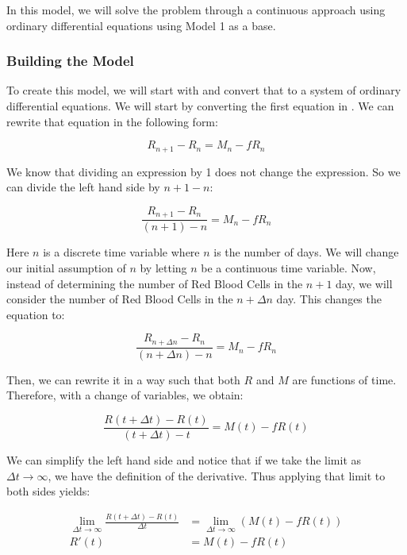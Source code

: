 In this model, we will solve the problem through a continuous approach using ordinary differential equations using Model 1 as a base.

\subsubsection{Building the Model}

To create this model, we will start with  and convert that to a system of ordinary differential equations. We will start by converting the first equation in . We can rewrite that equation in the following form:

\begin{equation*}
    R_{n+1} - R_n = M_n - fR_n
\end{equation*}

We know that dividing an expression by 1 does not change the expression. So we can divide the left hand side by $n+1-n$:

\begin{equation*}
    \frac{R_{n+1} - R_n}{(n+1)-n} = M_n - fR_n
\end{equation*}

Here $n$ is a discrete time variable where $n$ is the number of days. We will change our initial assumption of $n$ by letting $n$ be a continuous time variable. Now, instead of determining the number of Red Blood Cells in the $n+1$ day, we will consider the number of Red Blood Cells in the $n+\Delta n$ day. This changes the equation to:

\begin{equation*}
    \frac{R_{n+\Delta n} - R_n}{(n+\Delta n)-n} = M_n - fR_n
\end{equation*}

Then, we can rewrite it in a way such that both $R$ and $M$ are functions of time. Therefore, with a change of variables, we obtain:

\begin{equation*}
    \frac{R(t+\Delta t) - R(t)}{(t+\Delta t)-t} = M(t) - fR(t)
\end{equation*}

We can simplify the left hand side and notice that if we take the limit as $\Delta t\to\infty$, we have the definition of the derivative. Thus applying that limit to both sides yields:

\begin{align}
    \lim_{\Delta t\to\infty} \frac{R(t+\Delta t) - R(t)}{\Delta t} &= \lim_{\Delta t\to\infty} (M(t) - fR(t)) \nonumber\\
    R'(t) &= M(t) - fR(t) \label{eq:linear-differential-equation-R}
\end{align}

